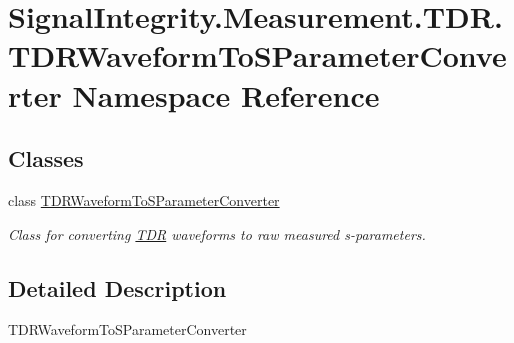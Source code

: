 \hypertarget{namespaceSignalIntegrity_1_1Measurement_1_1TDR_1_1TDRWaveformToSParameterConverter}{}\section{Signal\+Integrity.\+Measurement.\+T\+D\+R.\+T\+D\+R\+Waveform\+To\+S\+Parameter\+Converter Namespace Reference}
\label{namespaceSignalIntegrity_1_1Measurement_1_1TDR_1_1TDRWaveformToSParameterConverter}
\subsection*{Classes}
\begin{DoxyCompactItemize}
\item 
class \hyperlink{classSignalIntegrity_1_1Measurement_1_1TDR_1_1TDRWaveformToSParameterConverter_1_1TDRWaveformToSParameterConverter}{T\+D\+R\+Waveform\+To\+S\+Parameter\+Converter}
\begin{DoxyCompactList}\small\item\em Class for converting \hyperlink{namespaceSignalIntegrity_1_1Measurement_1_1TDR}{T\+DR} waveforms to raw measured s-\/parameters. \end{DoxyCompactList}\end{DoxyCompactItemize}


\subsection{Detailed Description}
\begin{DoxyVerb}TDRWaveformToSParameterConverter\end{DoxyVerb}
 